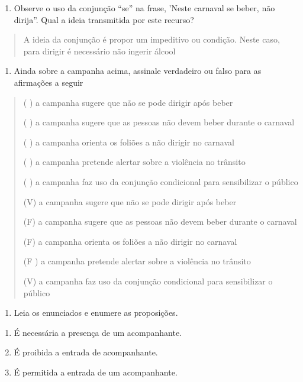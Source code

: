 \begin{enumerate}
\def\labelenumi{\arabic{enumi})}
\setcounter{enumi}{5}
\tightlist
\item
  Observe o uso da conjunção ``se'' na frase, 'Neste carnaval se beber,
  não dirija''. Qual a ideia transmitida por este recurso?
\end{enumerate}

\begin{quote}
A ideia da conjunção é propor um impeditivo ou condição. Neste caso,
para dirigir é necessário não ingerir álcool
\end{quote}

\begin{enumerate}
\def\labelenumi{\arabic{enumi})}
\setcounter{enumi}{6}
\tightlist
\item
  Ainda sobre a campanha acima, assinale verdadeiro ou falso para as
  afirmações a seguir
\end{enumerate}

\begin{quote}
( ) a campanha sugere que não se pode dirigir após beber

( ) a campanha sugere que as pessoas não devem beber durante o carnaval

( ) a campanha orienta os foliões a não dirigir no carnaval

( ) a campanha pretende alertar sobre a violência no trânsito

( ) a campanha faz uso da conjunção condicional para sensibilizar o
público

(V) a campanha sugere que não se pode dirigir após beber

(F) a campanha sugere que as pessoas não devem beber durante o carnaval

(F) a campanha orienta os foliões a não dirigir no carnaval

(F ) a campanha pretende alertar sobre a violência no trânsito

(V) a campanha faz uso da conjunção condicional para sensibilizar o
público
\end{quote}

\begin{enumerate}
\def\labelenumi{\arabic{enumi})}
\setcounter{enumi}{7}
\tightlist
\item
  Leia os enunciados e enumere as proposições.
\end{enumerate}

\begin{enumerate}
\def\labelenumi{(\arabic{enumi})}
\item
  É necessária a presença de um acompanhante.
\item
  É proibida a entrada de acompanhante.
\item
  É permitida a entrada de um acompanhante.
\end{enumerate}

